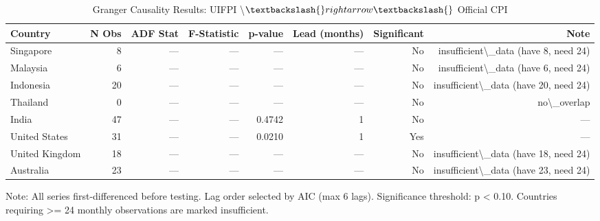 \begin{table}[htbp]
        \centering
        \caption{Granger Causality Results: UIFPI \textbackslash{}$\textbackslash{}rightarrow\textbackslash{}$ Official CPI}
        \label{tab:granger}
        \begin{tabular}{lrrrrrrr}
        \toprule
        \textbf{Country} & \textbf{N Obs} & \textbf{ADF Stat} & \textbf{F-Statistic} & \textbf{p-value} & \textbf{Lead (months)} & \textbf{Significant} & \textbf{Note} \\
        \midrule
        Singapore & 8 & — & — & — & — & No & insufficient\textbackslash{}_data (have 8, need 24) \\
Malaysia & 6 & — & — & — & — & No & insufficient\textbackslash{}_data (have 6, need 24) \\
Indonesia & 20 & — & — & — & — & No & insufficient\textbackslash{}_data (have 20, need 24) \\
Thailand & 0 & — & — & — & — & No & no\textbackslash{}_overlap \\
India & 47 & — & — & 0.4742 & 1 & No & --- \\
United States & 31 & — & — & 0.0210 & 1 & Yes & --- \\
United Kingdom & 18 & — & — & — & — & No & insufficient\textbackslash{}_data (have 18, need 24) \\
Australia & 23 & — & — & — & — & No & insufficient\textbackslash{}_data (have 23, need 24) \\
        \bottomrule
        \end{tabular}
        \footnotesize Note: All series first-differenced before testing. Lag order selected by AIC (max 6 lags). Significance threshold: p < 0.10. Countries requiring >= 24 monthly observations are marked insufficient.
        \end{table}
